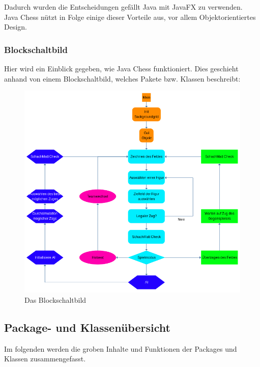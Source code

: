 \documentclass[12pt,a4paper]{article}
\begin{document}
{Dadurch wurden die Entscheidungen gefällt Java mit JavaFX zu verwenden.\\
Java Chess nützt in Folge einige dieser Vorteile aus, vor allem Objektorientiertes Design. 


\subsubsection{Blockschaltbild}
\label{SUBSUBSEC:BLOCKSCHALTBILD}

Hier wird ein Einblick gegeben, wie Java Chess funktioniert. Dies geschieht anhand von einem Blockschaltbild, welches Pakete bzw. Klassen beschreibt: \\
\vspace{1cm}


\begin{figure}[H]
  \centering
   	\includegraphics[width=14cm]{graphics/block.png}
  \caption{Das Blockschaltbild}
  \label{fig:block}
\end{figure}

\subsection{Package- und Klassenübersicht}
\label{SUBSEC:PACKAGE}

Im folgenden werden die groben Inhalte und Funktionen der Packages und Klassen zusammengefasst.\

}
\end{document}
